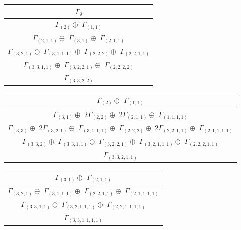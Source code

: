 \documentclass[main.tex]{subfiles}
\begin{document}
\begin{minipage}{.5\textwidth}
\centering
\begin{tabular}{c}
$\Gamma_\emptyset$
\\ \hline
$\Gamma_{(
2
)} \oplus$
$\Gamma_{(
1 , 
1
)}$
\\ \hline
$\Gamma_{(
2 , 
1 , 
1
)} \oplus$
$\Gamma_{(
3 , 
1
)} \oplus$
$\Gamma_{(
2 , 
1 , 
1
)}$
\\ \hline
$\Gamma_{(
3 , 
2 , 
1
)} \oplus$
$\Gamma_{(
3 , 
1 , 
1 , 
1
)} \oplus$
$\Gamma_{(
2 , 
2 , 
2
)} \oplus$
$\Gamma_{(
2 , 
2 , 
1 , 
1
)}$
\\ \hline
$\Gamma_{(
3 , 
3 , 
1 , 
1
)} \oplus$
$\Gamma_{(
3 , 
2 , 
2 , 
1
)} \oplus$
$\Gamma_{(
2 , 
2 , 
2 , 
2
)}$
\\ \hline
$\Gamma_{(
3 , 
3 , 
2 , 
2
)}$
\\
\end{tabular}\end{minipage}
\bigskip
\begin{minipage}{1\textwidth}
\centering
\begin{tabular}{c}
$\Gamma_{(
2
)} \oplus$
$\Gamma_{(
1 , 
1
)}$
\\ \hline
$\Gamma_{(
3 , 
1
)} \oplus$
$2\Gamma_{(
2 , 
2
)} \oplus$
$2\Gamma_{(
2 , 
1 , 
1
)} \oplus$
$\Gamma_{(
1 , 
1 , 
1 , 
1
)}$
\\ \hline
$\Gamma_{(
3 , 
3
)} \oplus$
$2\Gamma_{(
3 , 
2 , 
1
)} \oplus$
$\Gamma_{(
3 , 
1 , 
1 , 
1
)} \oplus$
$\Gamma_{(
2 , 
2 , 
2
)} \oplus$
$2\Gamma_{(
2 , 
2 , 
1 , 
1
)} \oplus$
$\Gamma_{(
2 , 
1 , 
1 , 
1 , 
1
)}$
\\ \hline
$\Gamma_{(
3 , 
3 , 
2
)} \oplus$
$\Gamma_{(
3 , 
3 , 
1 , 
1
)} \oplus$
$\Gamma_{(
3 , 
2 , 
2 , 
1
)} \oplus$
$\Gamma_{(
3 , 
2 , 
1 , 
1 , 
1
)} \oplus$
$\Gamma_{(
2 , 
2 , 
2 , 
1 , 
1
)}$
\\ \hline
$\Gamma_{(
3 , 
3 , 
2 , 
1 , 
1
)}$
\\
\end{tabular}\end{minipage}
\bigskip
\begin{minipage}{.5\textwidth}
\centering
\begin{tabular}{c}
$\Gamma_{(
3 , 
1
)} \oplus$
$\Gamma_{(
2 , 
1 , 
1
)}$
\\ \hline
$\Gamma_{(
3 , 
2 , 
1
)} \oplus$
$\Gamma_{(
3 , 
1 , 
1 , 
1
)} \oplus$
$\Gamma_{(
2 , 
2 , 
1 , 
1
)} \oplus$
$\Gamma_{(
2 , 
1 , 
1 , 
1 , 
1
)}$
\\ \hline
$\Gamma_{(
3 , 
3 , 
1 , 
1
)} \oplus$
$\Gamma_{(
3 , 
2 , 
1 , 
1 , 
1
)} \oplus$
$\Gamma_{(
2 , 
2 , 
1 , 
1 , 
1 , 
1
)}$
\\ \hline
$\Gamma_{(
3 , 
3 , 
1 , 
1 , 
1 , 
1
)}$
\\
\end{tabular}\end{minipage}
\end{document}
